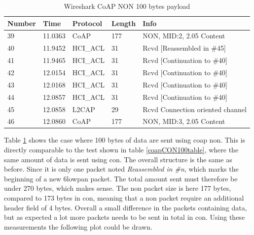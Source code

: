 \begin{table}[H]
\small
\centering
\caption{Wireshark CoAP NON 100 bytes payload}
\label{coapNON100table}
\begin{tabular}{lllll}
\hline
Number & Time    & Protocol & Length & Info   							  \\ \hline                          
39     & 11.0363 & CoAP     & 177    & NON, MID:2, 2.05 Content         \\
40     & 11.9452 & HCI\_ACL & 31     & Rcvd {[}Reassembled in \#45{]}   \\
41     & 11.9465 & HCI\_ACL & 31     & Rcvd {[}Continuation to \#40{]}  \\
42     & 12.0154 & HCI\_ACL & 31     & Rcvd {[}Continuation to \#40{]}  \\
43     & 12.0168 & HCI\_ACL & 31     & Rcvd {[}Continuation to \#40{]}  \\
44     & 12.0857 & HCI\_ACL & 31     & Rcvd {[}Continuation to \#40{]}  \\
45     & 12.0858 & L2CAP    & 29     & Rcvd Connection oriented channel \\
46     & 12.0860 & CoAP     & 177    & NON, MID:3, 2.05 Content         \\ \hline
\end{tabular}
\end{table}

\noindent Table \ref{coapNON100table} shows the case where 100 bytes of data are sent using \gls{coap} \gls{non}. This is directly comparable to the test shown in table \ref{coapCON100table}, where the same amount of data is sent using \gls{con}. The overall structure is the same as before. Since it is only one packet noted \textit{Reassembled in \#n}, which marks the beginning of a new \gls{6lowpan} packet. The total amount sent must therefore be under 270 bytes, which makes sense. The \gls{non} packet size is here 177 bytes, compared to 173 bytes in \gls{con}, meaning that a \gls{non} packet require an additional header field of 4 bytes. Overall a small difference in the packets containing data, but as expected a lot more packets needs to be sent in total in \gls{con}. Using these measurements the following plot could be drawn. 




